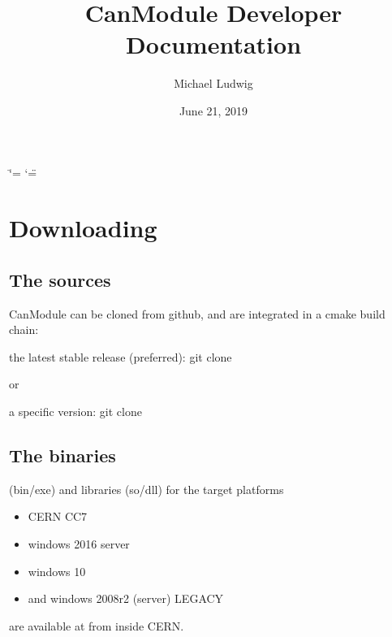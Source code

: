 \documentclass[letterpaper,10pt,english]{sphinxmanual}
\title{CanModule Developer Documentation}
\date{June 21, 2019}
\author{Michael Ludwig}
\begin{document}
\ifdefined\shorthandoff
  \ifnum\catcode`\=\string=\active\shorthandoff{=}\fi
  \ifnum\catcode`\"=\active{}\fi
\fi

\pagestyle{empty}
\sphinxmaketitle
\pagestyle{plain}
\sphinxtableofcontents
\pagestyle{normal}
\label{\detokenize{index::doc}}



\chapter{Downloading}
\label{\detokenize{downloading:downloading}}\label{\detokenize{downloading::doc}}

\section{The sources}
\label{\detokenize{downloading:the-sources}}
CanModule can be cloned from github, and are integrated in a cmake build chain:

the latest stable release (preferred):
git clone  

or

a specific version:
git clone  


\section{The binaries}
\label{\detokenize{downloading:the-binaries}}
(bin/exe) and libraries (so/dll) for the target platforms
\begin{itemize}
\item {} 
CERN CC7

\item {} 
windows 2016 server

\item {} 
windows 10

\item {} 
and windows 2008r2 (server) LEGACY

\end{itemize}

are available at  from inside CERN.
\end{document}
